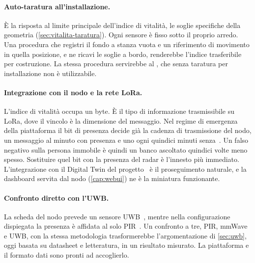 \paragraph{Auto-taratura all'installazione.} È la risposta al limite principale
dell'indice di vitalità, le soglie specifiche della geometria
(\cref{sec:vitalita-taratura}). Ogni sensore è fisso sotto il proprio arredo. Una
procedura che registri il fondo a stanza vuota e un riferimento di movimento in quella
posizione, e ne ricavi le soglie a bordo, renderebbe l'indice trasferibile per
costruzione. La stessa procedura servirebbe al \ldc, che senza taratura per
installazione non è utilizzabile.

\paragraph{Integrazione con il nodo e la rete LoRa.} L'indice di vitalità occupa un
byte. È il tipo di informazione trasmissibile su LoRa, dove il vincolo è la
dimensione del messaggio. Nel regime di emergenza della piattaforma il bit di presenza
decide già la cadenza di trasmissione del nodo, un messaggio al minuto con presenza e
uno ogni quindici minuti senza~\cite{callisto2026dipme}. Un falso negativo sulla
persona immobile è quindi un banco ascoltato quindici volte meno spesso. Sostituire
quel bit con la presenza del radar è l'innesto più immediato. L'integrazione con il
Digital Twin del progetto~\cite{callisto2024safe,callisto2023dt} è il proseguimento
naturale, e la dashboard servita dal nodo (\cref{cap:webui}) ne è la miniatura
funzionante.

\paragraph{Confronto diretto con l'UWB.} La scheda del nodo prevede un sensore
UWB~\cite{slideUprise}, mentre nella configurazione dispiegata la presenza è affidata
al solo PIR~\cite{callisto2026dipme}. Un confronto a tre, PIR, mmWave e UWB, con la
stessa metodologia trasformerebbe l'argomentazione di \cref{sec:uwb}, oggi basata su
datasheet e letteratura, in un risultato misurato. La piattaforma e il formato dati
sono pronti ad accoglierlo.
